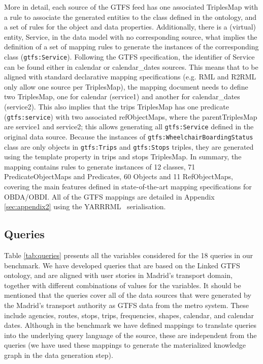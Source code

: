 More in detail, each source of the GTFS feed has one associated TriplesMap with a rule to associate the generated entities to the class defined in the ontology, and a set of rules for the object and data properties. Additionally, there is a (virtual) entity, Service, in the data model with no corresponding source, what implies the definition of a set of mapping rules to generate the instances of the corresponding class (\texttt{gtfs:Service}). Following the GTFS specification, the identifier of Service can be found either in calendar or calendar\_dates sources. This means that to be aligned with standard declarative mapping specifications (e.g. RML and R2RML only allow one source per TriplesMap), the mapping document needs to define two TriplesMap, one for calendar (service1) and another for calendar\_dates (service2). This also implies that the trips TriplesMap has one predicate (\texttt{gtfs:service}) with two associated refObjectMaps, where the parentTriplesMap are service1 and service2; this allows generating all \texttt{gtfs:Service} defined in the original data source. Because the instances of \texttt{gtfs:WheelchairBoardingStatus} class are only objects in \texttt{gtfs:Trips} and \texttt{gtfs:Stops} triples, they are generated using the template property in trips and stops TriplesMap. In summary, the mapping contains rules to generate instances of 12 classes, 71 PredicateObjectMaps and Predicates, 60 Objects and 11 RefObjectMaps, covering the main features defined in state-of-the-art mapping specifications for OBDA/OBDI. All of the GTFS mappings are detailed in Appendix \ref{sec:appendix2} using the YARRRML~\citep{Heyvaert2018Declarative} serialisation.

\subsection{Queries}
Table \ref{tab:queries} presents all the variables considered for the 18 queries in our benchmark. We have developed queries that are based on the Linked GTFS ontology, and are aligned with user stories in Madrid's transport domain, together with different combinations of values for the variables. It should be mentioned that the queries cover all of the data sources that were generated by the Madrid's transport authority as GTFS data from the metro system. These include agencies, routes, stops, trips, frequencies, shapes, calendar, and calendar dates. Although in the benchmark we have defined mappings to translate queries into the underlying query language of the source, these are independent from the queries (we have used these mappings to generate the materialized knowledge graph in the data generation step).

